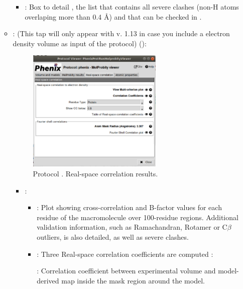 \begin{itemize}
\begin{itemize}
\begin{itemize}
         \item {}: Box to detail , the list that contains all severe clashes (non-H atoms overlaping more than 0.4 \AA) and that can be checked in \coot.
        \end{itemize}
      \item {}: (This tap will only appear with \phenix v. 1.13 in case you include a electron density volume as input of the protocol) ():
       \begin{figure}[H]
         \centering 
         \captionsetup{width=.7\linewidth} 
         \includegraphics[width=0.65\textwidth]{Images_appendix/Fig146.pdf}
         \caption{Protocol . Real-space correlation results.}
         \label{fig:app_protocol_molprobity_4}
        \end{figure}
        \begin{itemize}
         \item {}: 
         \begin{itemize}
          \item {}: Plot showing cross-correlation and B-factor values for each residue of the macromolecule over 100-residue regions. Additional validation information, such as Ramachandran, Rotamer or C{$\beta$} outliers, is also detailed, as well as severe clashes.  
          \item {}: Three Real-space correlation coefficients are computed \citep{afonine2018b}: \setlength{\parindent}{12pt}
          
           : Correlation coefficient between experimental volume and model-derived map inside the mask region around the model.
           

\end{itemize}
\end{itemize}
\end{itemize}
\end{itemize}
